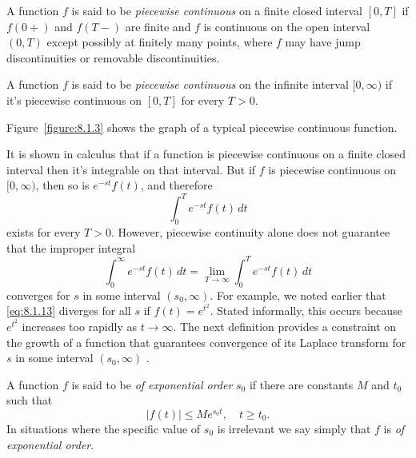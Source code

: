 \color{blue}
\color{black}

\begin{definition}
  \color{blue}
  \label{thmtype:8.1.4}\rm \mbox{}
  \begin{rmlist}
    \item %
    A function $f$ is said to be {\color{blue}\it piecewise continuous} on a finite closed interval
    $[0,T]$ if $f(0+)$ and $f(T-)$ are finite and $f$ is continuous on the open interval $(0,T)$
    except possibly at finitely many points, where $f$ may have jump discontinuities or removable
    discontinuities.

    \item %
    A function $f$ is said to be {\color{blue}\it piecewise continuous} on the infinite interval
    $[0,\infty)$ if it's piecewise continuous on $[0,T]$ for every $T>0$.
  \end{rmlist}
\end{definition}

Figure~\ref{figure:8.1.3} shows the graph of a typical piecewise continuous function.

It is shown in calculus that if a function is piecewise continuous on a finite closed interval then
it's integrable on that interval. But if $f$ is piecewise continuous on $[0,\infty)$, then so is
$e^{-st}f (t)$, and therefore
\[
  \int_{0}^{T}e^{-st}f(t)\,dt
\]
exists for every $T>0$. However, piecewise continuity alone does not guarantee that the improper
integral
\begin{equation}
  \label{eq:8.1.13}\int_{0}^{\infty}e^{-st}f(t)\,dt=\lim_{T\to\infty}\int_{0}^{T}e^{-st}f(t)\, dt
\end{equation}
converges for $s$ in some interval $(s_{0},\infty)$. For example, we noted earlier that
\eqref{eq:8.1.13} diverges for all $s$ if $f(t)=e^{t^{2}}$. Stated informally, this occurs because
$e^{t^{2}}$ increases too rapidly as $t\to\infty$. The next definition provides a constraint on the
growth of a function that guarantees convergence of its Laplace transform for $s$ in some interval
$(s_{0},\infty)$ .

\begin{definition}
  \color{blue}
  \label{thmtype:8.1.5}\rm A function $f$ is said to be {\color{blue}\it of exponential order\/}
  $s_{0}$ if there are constants $M$ and $t_{0}$ such that
  \begin{equation}
    \label{eq:8.1.14}|f(t)|\le Me^{s_{0}t},\quad t\ge t_{0}.
  \end{equation}
  In situations where the specific value of $s_{0}$ is irrelevant we say simply that $f$ is
  {\color{blue}\it of exponential order\/}.
\end{definition}

